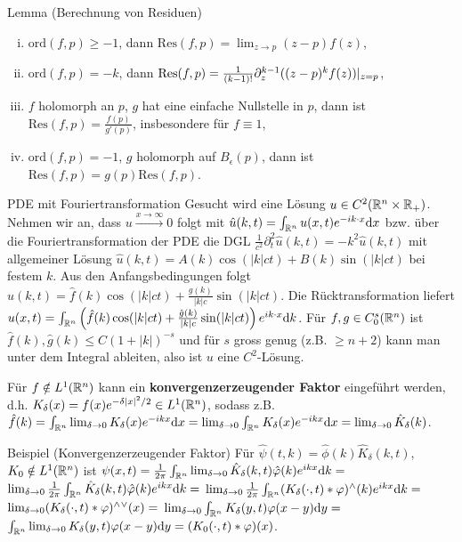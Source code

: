 \begin{namedtheorem}{Lemma (Berechnung von Residuen)} \hspace*{\fill}
  \begin{enumerate}[(i)]
    \item $\mathrm{ord}(f,p)\geq -1$, dann $\mathrm{Res}(f,p)=\lim_{z\rightarrow p} (z-p)f(z)$,
    \item $\mathrm{ord}(f,p) = -k$, dann $\mathrm{Res}(f,p)=\frac1{(k-1)!}\partial^{k-1}_z ( (z-p)^kf(z) ) \arrowvert_{z=p}$,
    \item $f$ holomorph an $p$, $g$ hat eine einfache Nullstelle in $p$, dann ist $\mathrm{Res}(f,p)=\frac{f(p)}{g'(p)}$, insbesondere für $f\equiv1$,
    \item $\mathrm{ord}(f,p)=-1$, $g$ holomorph auf $B_{\epsilon}(p)$, dann ist $\mathrm{Res}(f,p)=g(p)\mathrm{Res}(f,p)$.
  \end{enumerate}
\end{namedtheorem}

\begin{namedtheorem}{PDE mit Fouriertransformation}
  Gesucht wird eine Lösung $u\in C^2(\mathbb{R}^n\times\mathbb{R}_{+})$. Nehmen wir an, dass $u\overset{x\rightarrow\infty}{\rightarrow}0$ folgt mit $\hat{u}(k,t)=\int_{\mathbb{R}^n}u(x,t)e^{-ik\cdot x}\mathrm{d}x$ bzw. über die Fouriertransformation der PDE die DGL $\frac1{c^2}\partial_t^2\hat{u}(k,t)=-k^2\hat{u}(k,t)$ mit allgemeiner Lösung $\hat{u}(k,t)=A(k)\cos(|k|ct)+B(k)\sin(|k|ct)$ bei festem $k$. Aus den Anfangsbedingungen folgt $\hat{u}(k,t)=\hat{f}(k)\cos(|k|ct)+\frac{\hat{g}(k)}{|k|c}\sin(|k|ct)$. Die Rücktransformation liefert $u(x,t)=\int_{\mathbb{R}^n} \left( \hat{f}(k)\cos(|k|ct)+\frac{\hat{g}(k)}{|k|c}\sin(|k|ct)\right) e^{ik\cdot x} \mathrm{d} k$. Für $f,g\in C^s_0(\mathbb{R}^n)$ ist $\hat{f}(k),\hat{g}(k)\leq C (1+|k|)^{-s}$ und für $s$ gross genug (z.B. $\geq n+2$) kann man unter dem Integral ableiten, also ist $u$ eine $C^2$-Lösung.
\end{namedtheorem}

Für $f\notin L^1(\mathbb{R}^n)$ kann ein \textbf{konvergenzerzeugender Faktor} eingeführt werden, d.h. $K_{\delta}(x)=f(x)e^{-\delta|x|^2/2}\in L^1(\mathbb{R}^n)$, sodass z.B. $\hat{f}(k)=\int_{\mathbb{R}^n}\lim_{\delta\rightarrow0}K_{\delta}(x)e^{-ikx}\mathrm{d}x=\lim_{\delta\rightarrow0}\int_{\mathbb{R}^n}K_{\delta}(x)e^{-ikx}\mathrm{d}x=\lim_{\delta\rightarrow0}\hat{K}_{\delta}(k)$.

\begin{namedtheorem}{Beispiel (Konvergenzerzeugender Faktor)}
  Für $\hat{\psi}(t,k)=\hat{\phi}(k)\hat{K}_{\delta}(k,t)$, $K_0\notin L^1(\mathbb{R}^n)$ ist $\psi(x,t)=\frac1{2\pi}\int_{\mathbb{R}^n}\lim_{\delta\rightarrow0}\hat{K}_{\delta}(k,t)\hat{\varphi}(k)e^{ikx}\mathrm{d} k =$
  $\lim_{\delta\rightarrow0} \frac1{2\pi}\int_{\mathbb{R}^n}\hat{K}_{\delta}(k,t)\hat{\varphi}(k)e^{ikx}\mathrm{d} k =$
  $\lim_{\delta\rightarrow0} \frac1{2\pi}\int_{\mathbb{R}^n}(K_{\delta}(\cdot,t)\ast\varphi){}^{\wedge}(k)e^{ikx}\mathrm{d} k =$
  $\lim_{\delta\rightarrow0} (K_{\delta}(\cdot,t)\ast\varphi){}^{\wedge}{}^{\vee}(x)=$
  $\lim_{\delta\rightarrow0} \int_{\mathbb{R}^n}K_{\delta}(y,t)\varphi(x-y)\mathrm{d} y =$
  $\int_{\mathbb{R}^n}\lim_{\delta\rightarrow0}K_{\delta}(y,t)\varphi(x-y)\mathrm{d} y = (K_0(\cdot,t)\ast\varphi)(x)$.
\end{namedtheorem}

